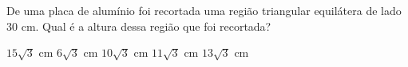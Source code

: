 \noindent\parbox{\linewidth}{

De uma placa de alumínio foi recortada uma região triangular equilátera de lado $30$ cm. Qual é a altura dessa região que foi recortada?

$15\sqrt{3}$ cm
$6\sqrt{3}$ cm
$10\sqrt{3}$ cm
$11\sqrt{3}$ cm
$13\sqrt{3}$ cm



}


